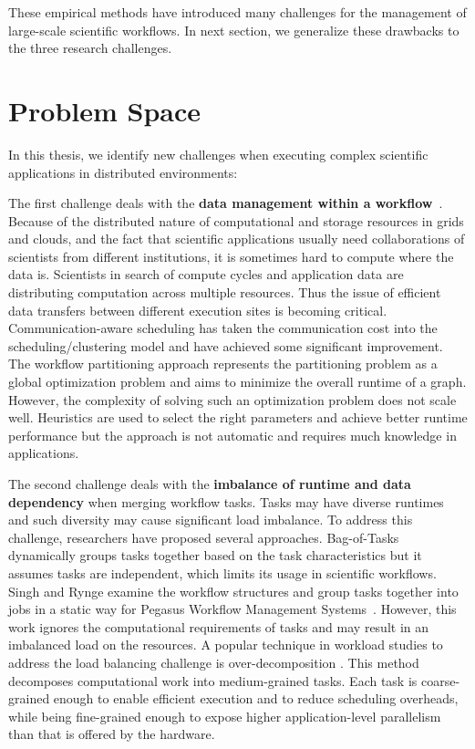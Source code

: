 These empirical methods have introduced many challenges for the management of large-scale scientific workflows. In next section, we generalize these drawbacks to the three research challenges. 

\section{Problem Space}

In this thesis, we identify new challenges when executing complex scientific applications in distributed environments:

The first challenge deals with the \textbf{data management within a workflow}~\cite{wang2013supporting, wang2012scimate, wang2014removing}. 
Because of the distributed nature of computational and storage resources in grids and clouds, and the fact that scientific applications usually need collaborations of scientists from different institutions, it is sometimes hard to compute where the data is. Scientists in search of compute cycles and application data are distributing computation across multiple resources. 
Thus the issue of efficient data transfers between different execution sites is becoming critical. 
Communication-aware scheduling \cite{Sonmez2006, Jones2004} has taken the communication cost into the scheduling/clustering model and have achieved some significant improvement. The workflow partitioning approach \cite{Hedayat2009, Yuan2010, Wieczorek2005,Rubing2005} represents the partitioning problem as a global optimization problem and aims to minimize the overall runtime of a graph. However, the complexity of solving such an optimization problem does not scale well. Heuristics \cite{Maheshwari2012, Callaghan2010} are used to select the right parameters and achieve better runtime performance but the approach is not automatic and requires much knowledge in applications. 


The second challenge deals with the \textbf{imbalance of runtime and data dependency} when merging workflow tasks. Tasks may have diverse runtimes and such diversity may cause significant load imbalance. To address this challenge, researchers have proposed several approaches. Bag-of-Tasks \cite{Hussin2010, Celaya2010, Oprescu2010} dynamically groups tasks together based on the task characteristics but it assumes tasks are independent, which limits its usage in scientific workflows. Singh \cite{Singh2008} and Rynge \cite{Rynge2012} examine the workflow structures and group tasks together into jobs in a static way for Pegasus Workflow Management Systems~\cite{Deelman2004}.
However, this work ignores the computational requirements of tasks and may result in an imbalanced load on the resources. A popular technique in workload studies to address the load balancing challenge is over-decomposition \cite{Lifflander2012}. This method decomposes computational work into medium-grained tasks. Each task is coarse-grained enough to enable efficient execution and to reduce scheduling overheads, while being fine-grained enough to expose higher application-level parallelism than that is offered by the hardware. 

